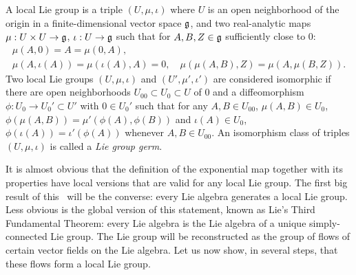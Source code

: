 \begin{defn}
    A local Lie group is a triple $(U,\mu,\iota)$ where $U$ is an open neighborhood of the origin in a finite-dimensional vector space $\mathfrak{g}$, and two real-analytic maps $\mu:U\times U\to\mathfrak{g}$, $\iota:U\to\mathfrak{g}$ such that for $A,B,Z\in\mathfrak{g}$ sufficiently close to $0$:
    \begin{gather}
        \mu(A,0)=A=\mu(0,A),\\
        \mu(A,\iota(A))=\mu(\iota(A),A)=0,\quad \mu(\mu(A,B),Z)=\mu(A,\mu(B,Z)).
    \end{gather}
    Two local Lie groups $(U,\mu,\iota)$ and $(U',\mu',\iota')$ are considered isomorphic if there are open neighborhoods $U_{00}\subset U_0\subset U$ of $0$ and a diffeomorphism $\phi:U_0\to U_0'\subset U'$ with $0\in U_0'$ such that for any $A,B\in U_{00}$, $\mu(A,B)\in U_0$, $\phi(\mu(A,B))=\mu'(\phi(A),\phi(B))$ and $\iota(A)\in U_0$, $\phi(\iota(A))=\iota'(\phi(A))$ whenever $A,B\in U_{00}$. An isomorphism class of triples $(U,\mu,\iota)$ is called a \emph{Lie group germ}.
\end{defn}

It is almost obvious that the definition of the exponential map together with its properties have local versions that are valid for any local Lie group. The first big result of this \subsect\ will be the converse: every Lie algebra generates a local Lie group. Less obvious is the global version of this statement, known as Lie's Third Fundamental Theorem: every Lie algebra is the Lie algebra of a unique simply-connected Lie group. The Lie group will be reconstructed as the group of flows of certain vector fields on the Lie algebra. Let us now show, in several steps, that these flows form a local Lie group.

